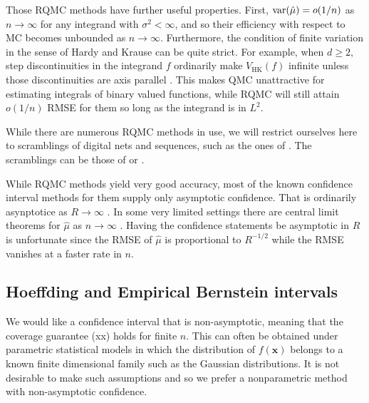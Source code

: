 \documentclass{article}
\renewcommand{\ge}{\geqslant}
\newcommand{\bsx}{\boldsymbol{x}}
\newcommand{\hk}{\mathrm{HK}}
\begin{document}
Those RQMC methods have further
useful properties.  First,  $\operatorname{var}(\hat\mu) = o(1/n)$ as $n\to\infty$
for any integrand with $\sigma^2<\infty$, and so their
efficiency with respect to MC becomes unbounded as $n\to\infty$.
Furthermore, the condition of finite
variation in the sense of Hardy and Krause can be quite
strict. For example, when $d\ge2$, step discontinuities in the integrand
$f$ ordinarily make $V_{\hk}(f)$ infinite unless those discontinuities
are axis parallel \cite{Owe05a}. This makes QMC
unattractive for estimating integrals of binary
valued functions, while RQMC will still attain
$o(1/n)$ RMSE for them so long as the integrand
is in $L^2$.

While there are numerous RQMC methods in use, we
will restrict ourselves here to scramblings of digital nets
and sequences, such as the ones of \cite{Sob67}.
The scramblings can be those of \cite{Owe95} or
\cite{Mat98}.


While RQMC methods yield very good accuracy, most
of the known confidence interval methods for them
supply only asymptotic confidence. That is ordinarily
asynptotice as $R\to\infty$ \cite{naka:tuff:2024}.
In some very limited settings
there are central limit theorems for $\hat\mu$
as $n\to\infty$ \cite{Loh01}.
Having the confidence statements be asymptotic in $R$
is unfortunate since the RMSE of $\hat\mu$ 
is proportional to $R^{-1/2}$ while the RMSE
vanishes at a faster rate in $n$.



\subsection{Hoeffding and Empirical Bernstein intervals}

We would like a confidence interval that is non-asymptotic,
meaning that the coverage guarantee (xx) holds for finite $n$.
This can often be obtained under parametric statistical
models in which the distribution of $f(\bsx)$  belongs
to a known finite dimensional family such as the Gaussian
distributions.  It is not desirable to make such assumptions
and so we prefer a nonparametric method with non-asymptotic
confidence.  
\end{document}
